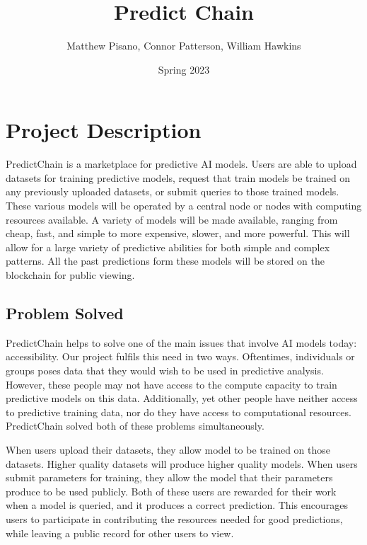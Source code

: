 \documentclass{article}
\title{Predict Chain}
\author{Matthew Pisano, Connor Patterson, William Hawkins}
\date{Spring 2023}
\begin{document}
    \maketitle

    \section{Project Description}

    PredictChain is a marketplace for predictive AI models. Users are able to upload datasets for training predictive models,
    request that train models be trained on any previously uploaded datasets, or submit queries to those trained models.
    These various models will be operated by a central node or nodes with computing resources available. A variety of
    models will be made available, ranging from cheap, fast, and simple to more expensive, slower, and more powerful.
    This will allow for a large variety of predictive abilities for both simple and complex patterns.  All the past
    predictions form these models will be stored on the blockchain for public viewing.

    \subsection{Problem Solved}

    PredictChain helps to solve one of the main issues that involve AI models today: accessibility.  Our project fulfils this
    need in two ways.  Oftentimes, individuals or groups poses data that they would wish to be used in predictive analysis.
    However, these people may not have access to the compute capacity to train predictive models on this data.  Additionally,
    yet other people have neither access to predictive training data, nor do they have access to computational resources.
    PredictChain solved both of these problems simultaneously.

    When users upload their datasets, they allow model to be trained on those datasets.  Higher quality datasets will produce
    higher quality models.  When users submit parameters for training, they allow the model that their parameters produce to
    be used publicly.  Both of these users are rewarded for their work when a model is queried, and it produces a correct
    prediction.  This encourages users to participate in contributing the resources needed for good predictions, while
    leaving a public record for other users to view.
\end{document}

